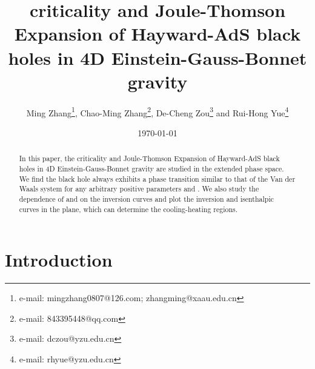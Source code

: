 \documentclass[aps,11pt]{revtex4}
\begin{document}
\title{ criticality and Joule-Thomson Expansion of Hayward-AdS black holes in 4D Einstein-Gauss-Bonnet gravity}

\author{Ming Zhang\footnote{e-mail: mingzhang0807@126.com; zhangming@xaau.edu.cn}, Chao-Ming Zhang\footnote{e-mail: 843395448@qq.com}, De-Cheng Zou\footnote{e-mail: dczou@yzu.edu.cn} and Rui-Hong Yue\footnote{e-mail: rhyue@yzu.edu.cn}}

\address{Faculty of Science, Xi'an Aeronautical University, Xi'an 710077 China\\
Center for Gravitation and Cosmology, College of Physical Science and Technology, Yangzhou University, Yangzhou 225009, China}

\date{\today}

\begin{abstract}
\indent

In this paper, the  criticality and Joule-Thomson Expansion of Hayward-AdS black holes in 4D Einstein-Gauss-Bonnet gravity are studied in the extended phase space. We find the black hole always exhibits a phase transition similar to that of the Van der Waals system for any arbitrary positive parameters  and . We also study the dependence of  and  on the inversion curves and plot the inversion and isenthalpic curves in the  plane, which can determine the cooling-heating regions.
\end{abstract}



\maketitle


\section{Introduction}
\label{intro}
\end{document}
